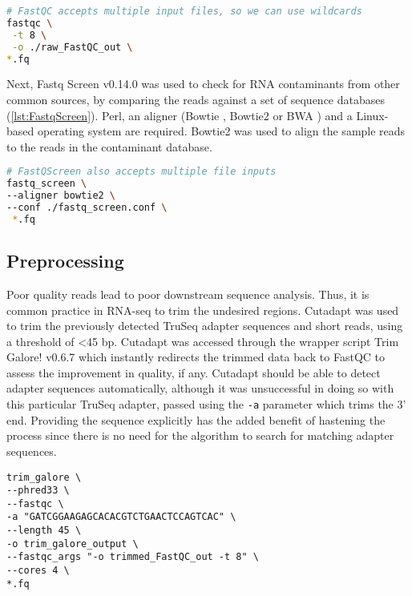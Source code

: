 \begin{lstlisting}[language=bash, caption=FastQC command, label={lst:FastQC}]
# FastQC accepts multiple input files, so we can use wildcards
fastqc \
 -t 8 \
 -o ./raw_FastQC_out \
*.fq 
\end{lstlisting}

Next, Fastq Screen v0.14.0 \citep{wingett2018fastq} was used to check for RNA contaminants from other common sources, by comparing the reads against a set of sequence databases (\autoref{lst:FastqScreen}). Perl, an aligner (Bowtie \citep{bowtie}, Bowtie2 \citep{bowtie2} or BWA \citep{bwa}) and a Linux-based operating system are required. Bowtie2 was used to align the sample reads to the reads in the contaminant database.

\begin{lstlisting}[language=bash, caption=FastqScreen command, label={lst:FastqScreen}]
# FastQScreen also accepts multiple file inputs
fastq_screen \
--aligner bowtie2 \
--conf ./fastq_screen.conf \
 *.fq 
\end{lstlisting}

\subsection{Preprocessing}
Poor quality reads lead to poor downstream sequence analysis. Thus, it is common practice in RNA-seq to trim the undesired regions. Cutadapt \citep{martin2011cutadapt} was used to trim the previously detected TruSeq adapter sequences and short reads, using a threshold of <45 bp. Cutadapt was accessed through the wrapper script Trim Galore! v0.6.7 \citep{trimgalore} which instantly redirects the trimmed data back to FastQC to assess the improvement in quality, if any. Cutadapt should be able to detect adapter sequences automatically, although it was unsuccessful in doing so with this particular TruSeq adapter, passed using the \texttt{-a} parameter which trims the 3' end. %
Providing the sequence explicitly has the added benefit of hastening the process since there is no need for the algorithm to search for matching adapter sequences.

\begin{lstlisting}[caption=Trim Galore! trimming]
trim_galore \
--phred33 \
--fastqc \
-a "GATCGGAAGAGCACACGTCTGAACTCCAGTCAC" \
--length 45 \
-o trim_galore_output \
--fastqc_args "-o trimmed_FastQC_out -t 8" \
--cores 4 \
*.fq 
\end{lstlisting}

